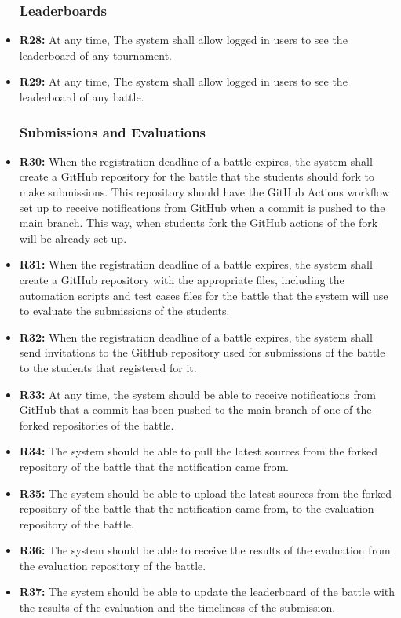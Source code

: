 \documentclass{article}
\begin{document}
\begin{itemize}
    \subsubsection*{Leaderboards}

    \item \textbf{R28:} At any time, The system shall allow logged in users to see the leaderboard of any tournament.
    \item \textbf{R29:} At any time, The system shall allow logged in users to see the leaderboard of any battle.
    
    \subsubsection*{Submissions and Evaluations}

    \item \textbf{R30:} When the registration deadline of a battle expires, the system shall create a GitHub repository for the battle that the students should fork to make submissions. This repository should have the GitHub Actions workflow set up to receive notifications from GitHub when a commit is pushed to the main branch. This way, when students fork the GitHub actions of the fork will be already set up.
    \item \textbf{R31:} When the registration deadline of a battle expires, the system shall create a GitHub repository with the appropriate files, including the automation scripts and test cases files for the battle that the system will use to evaluate the submissions of the students.
    \item \textbf{R32:} When the registration deadline of a battle expires, the system shall send invitations to the GitHub repository used for submissions of the battle to the students that registered for it.
    \item \textbf{R33:} At any time, the system should be able to receive notifications from GitHub that a commit has been pushed to the main branch of one of the forked repositories of the battle.
    \item \textbf{R34:} The system should be able to pull the latest sources from the forked repository of the battle that the notification came from.
    \item \textbf{R35:} The system should be able to upload the latest sources from the forked repository of the battle that the notification came from, to the evaluation repository of the battle.
    \item \textbf{R36:} The system should be able to receive the results of the evaluation from the evaluation repository of the battle.
    \item \textbf{R37:} The system should be able to update the leaderboard of the battle with the results of the evaluation and the timeliness of the submission.
    

\end{itemize}
\end{document}
